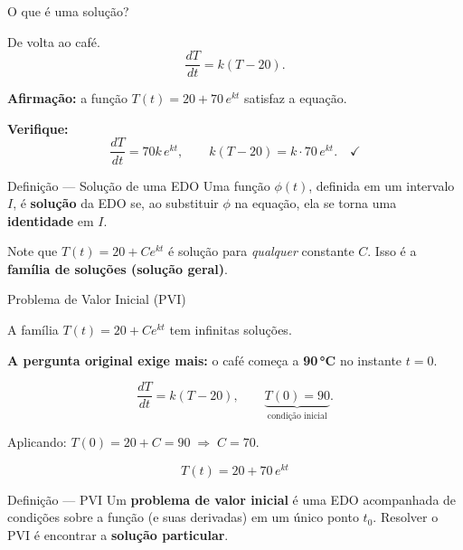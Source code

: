 \documentclass[12pt]{beamer}
\begin{document}

\begin{frame}{O que é uma solução?}

  De volta ao café.
  \[
    \frac{dT}{dt} = k(T - 20).
  \]

  \pause
  \vspace{6pt}
  \textbf{Afirmação:} a função $T(t) = 20 + 70\,e^{kt}$ satisfaz a equação.

  \vspace{6pt}
  \textbf{Verifique:}
  \[
    \frac{dT}{dt} = 70k\,e^{kt}, \qquad
    k(T - 20) = k \cdot 70\,e^{kt}. \quad \checkmark
  \]

  \pause
  \vspace{6pt}
  \begin{exampleblock}{Definição — Solução de uma EDO}
    Uma função $\phi(t)$, definida em um intervalo $I$,
    é \textbf{solução} da EDO se, ao substituir $\phi$ na equação,
    ela se torna uma \textbf{identidade} em $I$.
  \end{exampleblock}

  \pause
  \vspace{6pt}
  Note que $T(t) = 20 + Ce^{kt}$ é solução para \emph{qualquer} constante $C$.
  Isso é a \textbf{família de soluções (solução geral)}.

\end{frame}

\begin{frame}{Problema de Valor Inicial (PVI)}

  A família $T(t) = 20 + Ce^{kt}$ tem infinitas soluções.

  \vspace{8pt}
  \textbf{A pergunta original exige mais:}
  o café começa a \textbf{90\,°C} no instante $t = 0$.

  \[
    \frac{dT}{dt} = k(T - 20), \qquad \underbrace{T(0) = 90}_{\text{condição inicial}}.
  \]

  \pause
  \vspace{6pt}
  Aplicando: $T(0) = 20 + C = 90 \;\Rightarrow\; C = 70$.

  \vspace{6pt}
  \[
    \boxed{T(t) = 20 + 70\,e^{kt}}
  \]

  \pause
  \vspace{6pt}
  \begin{exampleblock}{Definição — PVI}
    Um \textbf{problema de valor inicial} é uma EDO acompanhada de
    condições sobre a função (e suas derivadas) em um único ponto $t_0$.
    Resolver o PVI é encontrar a \textbf{solução particular}.
  \end{exampleblock}

\end{frame}
\end{document}
